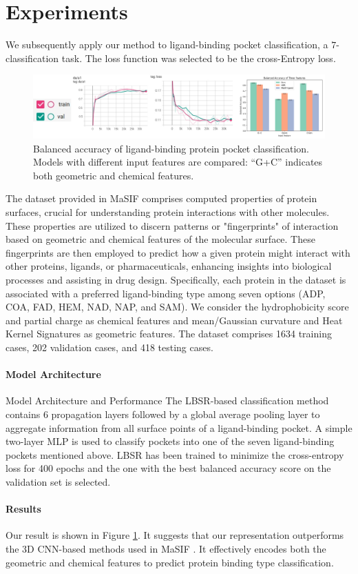 \section{Experiments}

We subsequently apply our method to ligand-binding pocket classification, a $7$-classification task. The loss function was selected to be the cross-Entropy loss.

\begin{figure}[htp]
    \centering
    \includegraphics[width=\linewidth]{figures/result.png}
    \caption{
        Balanced accuracy of ligand-binding protein pocket classification.
        Models with different input features are compared: ``G+C'' indicates both geometric and chemical features.
    }
    \label{fig:ligand-binding-result}
\end{figure}

The dataset provided in MaSIF \cite{MaSIF} comprises computed properties of protein surfaces, crucial for understanding protein interactions with other molecules. These properties are utilized to discern patterns or "fingerprints" of interaction based on geometric and chemical features of the molecular surface. These fingerprints are then employed to predict how a given protein might interact with other proteins, ligands, or pharmaceuticals, enhancing insights into biological processes and assisting in drug design. Specifically, each protein in the dataset is associated with a preferred ligand-binding type among seven options (ADP, COA, FAD, HEM, NAD, NAP, and SAM). We consider the hydrophobicity score and partial charge as chemical features and mean/Gaussian curvature and Heat Kernel Signatures as geometric features. The dataset comprises 1634 training cases, 202 validation cases, and 418 testing cases.
\paragraph{Model Architecture}
Model Architecture and Performance 
The LBSR-based classification method contains 6 propagation layers followed by a global average pooling layer to aggregate information from all surface points of a ligand-binding pocket. A simple two-layer MLP is used to classify pockets into one of the seven ligand-binding pockets mentioned above.
LBSR has been trained to minimize the cross-entropy loss for 400 epochs and the one with the best balanced accuracy score on the validation set is selected.
\paragraph{Results}
Our result is shown in Figure \ref{fig:ligand-binding-result}. It suggests that our representation outperforms the 3D CNN-based methods used in MaSIF \cite{MaSIF}. It effectively encodes both the geometric and chemical features to predict protein binding type classification.